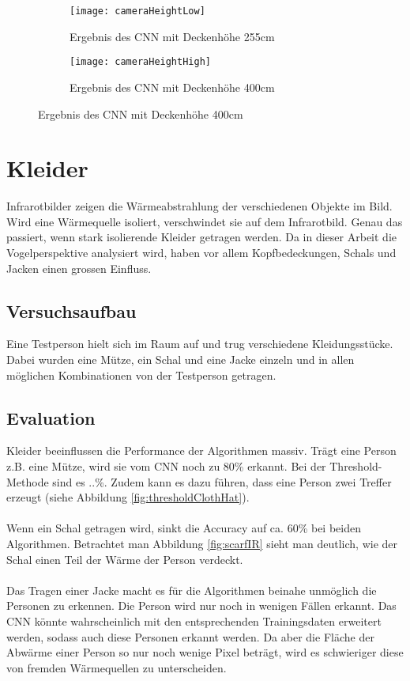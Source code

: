 \begin{figure}[H]
	\begin{subfigure}{.45\linewidth}
		\centering
		\texttt{[image: cameraHeightLow]}
		\caption{Ergebnis des \gls{CNN} mit Deckenhöhe 255cm}
		\label{fig:cameraHeightLow}
	\end{subfigure}
	\begin{subfigure}{.45\linewidth}
		\centering
		\texttt{[image: cameraHeightHigh]}
		\caption{Ergebnis des \gls{CNN} mit Deckenhöhe 400cm}
		\label{fig:cameraHeightHigh}
	\end{subfigure}
\end{figure}


\section{Kleider}
\label{sec:cloths}

Infrarotbilder zeigen die Wärmeabstrahlung der verschiedenen Objekte im Bild. Wird eine Wärmequelle isoliert, verschwindet sie auf dem Infrarotbild. Genau das passiert, wenn stark isolierende Kleider getragen werden. Da in dieser Arbeit die Vogelperspektive analysiert wird, haben vor allem Kopfbedeckungen, Schals und Jacken einen grossen Einfluss. 

\subsection{Versuchsaufbau}

Eine Testperson hielt sich im Raum auf und trug verschiedene Kleidungsstücke. Dabei wurden eine Mütze, ein Schal und eine Jacke einzeln und in allen möglichen Kombinationen von der Testperson getragen.

\subsection{Evaluation}
Kleider beeinflussen die Performance der Algorithmen massiv. Trägt eine Person z.B. eine Mütze, wird sie vom \gls{CNN} noch zu 80\% erkannt. Bei der Threshold-Methode sind es ..\%. Zudem kann es dazu führen, dass eine Person zwei Treffer erzeugt (siehe Abbildung \ref{fig:thresholdClothHat}).\\
\\
Wenn ein Schal getragen wird, sinkt die Accuracy auf ca. 60\% bei beiden Algorithmen. Betrachtet man Abbildung \ref{fig:scarfIR} sieht man deutlich, wie der Schal einen Teil der Wärme der Person verdeckt.\\
\\
Das Tragen einer Jacke macht es für die Algorithmen beinahe unmöglich die Personen zu erkennen. Die Person wird nur noch in wenigen Fällen erkannt. Das \gls{CNN} könnte wahrscheinlich mit den entsprechenden Trainingsdaten erweitert werden, sodass auch diese Personen erkannt werden. Da aber die Fläche der Abwärme einer Person so nur noch wenige Pixel beträgt, wird es schwieriger diese von fremden Wärmequellen zu unterscheiden.\\

